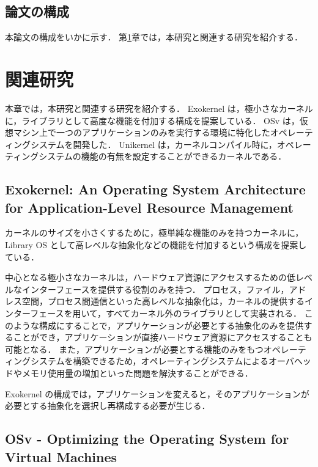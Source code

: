 \documentclass[graduation-thesis]{mlarticle}
\begin{document}
\subsection {論文の構成}
\label{intro:arch}
本論文の構成をいかに示す．
第\ref{relative}章では，本研究と関連する研究を紹介する．

\section {関連研究}
\label{relative}

本章では，本研究と関連する研究を紹介する．
Exokernel は，極小さなカーネルに，ライブラリとして高度な機能を付加する構成を提案している．
OSv は，仮想マシン上で一つのアプリケーションのみを実行する環境に特化したオペレーティングシステムを開発した．
Unikernel は，カーネルコンパイル時に，オペレーティングシステムの機能の有無を設定することができるカーネルである．

\subsection {Exokernel: An Operating System Architecture for Application-Level Resource Management}
\label{ralarive:exokernel}
カーネルのサイズを小さくするために，極単純な機能のみを持つカーネルに，Library OS として高レベルな抽象化などの機能を付加するという構成を提案している．

中心となる極小さなカーネルは，ハードウェア資源にアクセスするための低レベルなインターフェースを提供する役割のみを持つ．
プロセス，ファイル，アドレス空間，プロセス間通信といった高レベルな抽象化は，カーネルの提供するインターフェースを用いて，すべてカーネル外のライブラリとして実装される．
このような構成にすることで，アプリケーションが必要とする抽象化のみを提供することができ，アプリケーションが直接ハードウェア資源にアクセスすることも可能となる．
また，アプリケーションが必要とする機能のみをもつオペレーティングシステムを構築できるため，オペレーティングシステムによるオーバヘッドやメモリ使用量の増加といった問題を解決することができる．


Exokernel の構成では，アプリケーションを変えると，そのアプリケーションが必要とする抽象化を選択し再構成する必要が生じる．

\subsection {OSv - Optimizing the Operating System for Virtual Machines}
\end{document}
